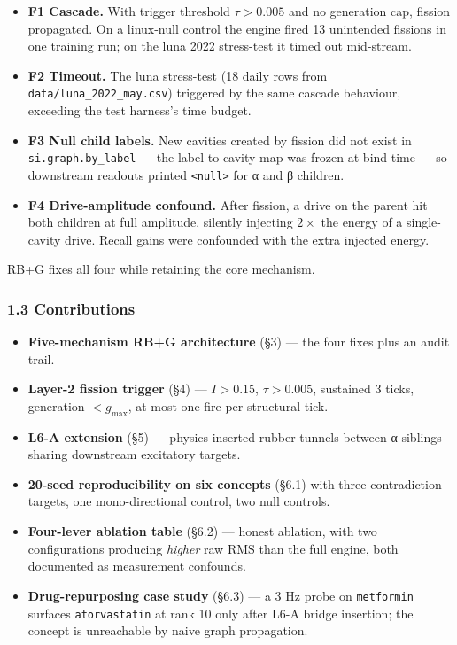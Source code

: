 \documentclass[
  11pt,
  a4paper,
]{article}
\providecommand{\tightlist}{%
  \setlength{\itemsep}{0pt}\setlength{\parskip}{0pt}}
\begin{document}
\begin{itemize}
\tightlist
\item
  \textbf{F1 Cascade.} With trigger threshold \(\tau > 0.005\) and no
  generation cap, fission propagated. On a linux-null control the engine
  fired 13 unintended fissions in one training run; on the luna 2022
  stress-test it timed out mid-stream.
\item
  \textbf{F2 Timeout.} The luna stress-test (18 daily rows from
  \texttt{data/luna\_2022\_may.csv}) triggered by the same cascade
  behaviour, exceeding the test harness's time budget.
\item
  \textbf{F3 Null child labels.} New cavities created by fission did not
  exist in \texttt{si.graph.by\_label} --- the label-to-cavity map was
  frozen at bind time --- so downstream readouts printed
  \texttt{\textless{}null\textgreater{}} for α and β children.
\item
  \textbf{F4 Drive-amplitude confound.} After fission, a drive on the
  parent hit both children at full amplitude, silently injecting
  \(2\times\) the energy of a single-cavity drive. Recall gains were
  confounded with the extra injected energy.
\end{itemize}

RB+G fixes all four while retaining the core mechanism.

\subsubsection{1.3 Contributions}\label{contributions}

\begin{itemize}
\tightlist
\item
  \textbf{Five-mechanism RB+G architecture} (§3) --- the four fixes plus
  an audit trail.
\item
  \textbf{Layer-2 fission trigger} (§4) --- \(I > 0.15\),
  \(\tau > 0.005\), sustained 3 ticks, generation \(< g_\text{max}\), at
  most one fire per structural tick.
\item
  \textbf{L6-A extension} (§5) --- physics-inserted rubber tunnels
  between α-siblings sharing downstream excitatory targets.
\item
  \textbf{20-seed reproducibility on six concepts} (§6.1) with three
  contradiction targets, one mono-directional control, two null
  controls.
\item
  \textbf{Four-lever ablation table} (§6.2) --- honest ablation, with
  two configurations producing \emph{higher} raw RMS than the full
  engine, both documented as measurement confounds.
\item
  \textbf{Drug-repurposing case study} (§6.3) --- a 3 Hz probe on
  \texttt{metformin} surfaces \texttt{atorvastatin} at rank 10 only
  after L6-A bridge insertion; the concept is unreachable by naive graph
  propagation.
\end{itemize}
\end{document}
